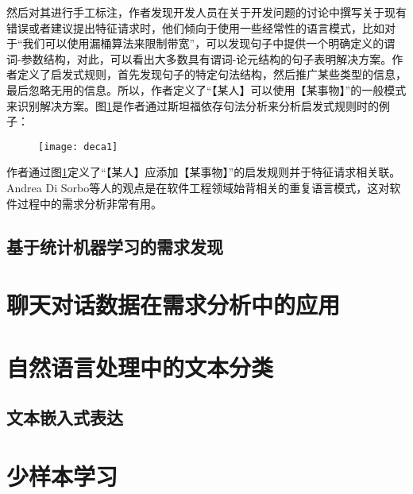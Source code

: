 然后对其进行手工标注，作者发现开发人员在关于开发问题的讨论中撰写关于现有错误或者建议提出特征请求时，他们倾向于使用一些经常性的语言模式，比如对于“我们可以使用漏桶算法来限制带宽”，可以发现句子中提供一个明确定义的谓词-参数结构，对此，可以看出大多数具有谓词-论元结构的句子表明解决方案。作者定义了启发式规则，首先发现句子的特定句法结构，然后推广某些类型的信息，最后忽略无用的信息。所以，作者定义了“【某人】可以使用【某事物】”的一般模式来识别解决方案。图\ref{fig:deca1}是作者通过斯坦福依存句法分析来分析启发式规则时的例子：

\begin{figure}[!htbp]
    \centering
    \texttt{[image: deca1]}
    \label{fig:deca1}
\end{figure}

作者通过图\ref{fig:deca1}定义了“【某人】应添加【某事物】”的启发规则并于特征请求相关联。Andrea Di Sorbo等人的观点是在软件工程领域始背相关的重复语言模式，这对软件过程中的需求分析非常有用。

\subsection{基于统计机器学习的需求发现}

\section{聊天对话数据在需求分析中的应用}

\section{自然语言处理中的文本分类}
\subsection{文本嵌入式表达}

\section{少样本学习}


\section{}


